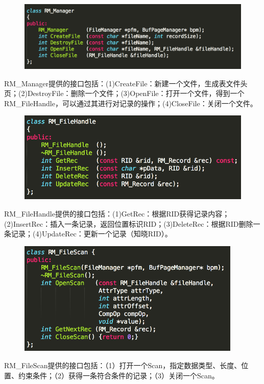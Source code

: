 \begin{figure}[H]
\centering
\includegraphics[width=5in]{Figures/RM_Manager.png}
\end{figure}

RM\_Manager提供的接口包括：(1)CreateFile：新建一个文件，生成表文件头页；(2)DestroyFile：删除一个文件；(3)OpenFile：打开一个文件，得到一个RM\_FileHandle，可以通过其进行对记录的操作；(4)CloseFile：关闭一个文件。

\begin{figure}[H]
\centering
\includegraphics[width=4.5in]{Figures/RM_FileHandle.png}
\end{figure}

RM\_FileHandle提供的接口包括：(1)GetRec：根据RID获得记录内容；(2)InsertRec：插入一条记录，返回位置标识RID；(3)DeleteRec：根据RID删除一条记录；(4)UpdateRec：更新一个记录（知晓RID）。

\begin{figure}[H]
\centering
\includegraphics[width=4.2in]{Figures/RM_FileScan.png}
\end{figure}

RM\_FileScan提供的接口包括：（1）打开一个Scan，指定数据类型、长度、位置、约束条件；（2）获得一条符合条件的记录；（3）关闭一个Scan。

